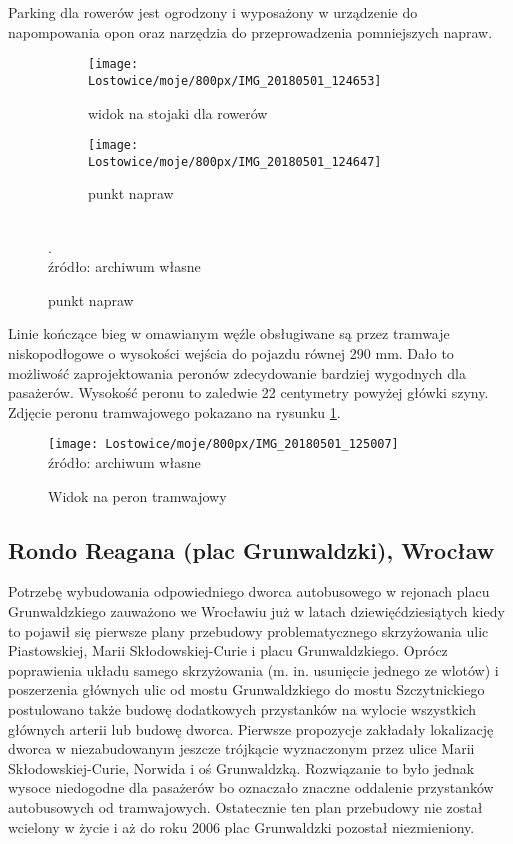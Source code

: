 \documentclass[twoside,12pt]{article}
\begin{document}
	Parking dla rowerów jest ogrodzony i wyposażony w urządzenie do napompowania opon oraz narzędzia do przeprowadzenia pomniejszych napraw.
	
	\begin{figure}[H]
		\centering
		\caption{Parking rowerowy}
		\begin{subfigure}{.66\textwidth}
	  \centering
	  \caption{widok na stojaki dla rowerów}
	  \texttt{[image: Lostowice/moje/800px/IMG\_20180501\_124653]}
		\end{subfigure}%
		\hfill%
		\begin{subfigure}{.33\textwidth}
	  \centering
	  \caption{punkt napraw}
	  \texttt{[image: Lostowice/moje/800px/IMG\_20180501\_124647]}
		\end{subfigure}\\
		
		\footnotesize{. \\ źródło: archiwum własne}
	\end{figure}	
	
	Linie kończące bieg w omawianym węźle obsługiwane są przez tramwaje niskopodłogowe o wysokości wejścia do pojazdu równej 290 mm. Dało to możliwość zaprojektowania peronów zdecydowanie bardziej wygodnych dla pasażerów. Wysokość peronu to zaledwie 22 centymetry powyżej główki szyny. Zdjęcie peronu tramwajowego pokazano na rysunku \ref{lostowice4}.
	
		\begin{figure}[H]
		\centering
		\caption{Widok na peron tramwajowy}
		\texttt{[image: Lostowice/moje/800px/IMG\_20180501\_125007]}\\
		\footnotesize{źródło: archiwum własne}
		\label{lostowice4}
	\end{figure}
	
	\clearpage
	\subsection{Rondo Reagana (plac Grunwaldzki), Wrocław}
	
	Potrzebę wybudowania odpowiedniego dworca autobusowego w rejonach placu Grunwaldzkiego zauważono we Wrocławiu już w latach dziewięćdziesiątych kiedy to pojawił się pierwsze plany przebudowy problematycznego skrzyżowania ulic Piastowskiej, Marii Skłodowskiej-Curie i placu Grunwaldzkiego. Oprócz poprawienia układu samego skrzyżowania (m. in. usunięcie jednego ze wlotów) i poszerzenia głównych ulic od mostu Grunwaldzkiego do mostu Szczytnickiego postulowano także budowę dodatkowych przystanków na wylocie wszystkich głównych arterii lub budowę dworca. Pierwsze propozycje zakładały lokalizację dworca w niezabudowanym jeszcze trójkącie wyznaczonym przez ulice Marii Skłodowskiej-Curie, Norwida i oś Grunwaldzką. Rozwiązanie to było jednak wysoce niedogodne dla pasażerów bo oznaczało znaczne oddalenie przystanków autobusowych od tramwajowych. Ostatecznie ten plan przebudowy nie został wcielony w życie i aż do roku 2006 plac Grunwaldzki pozostał niezmieniony. 
	
\end{document}
